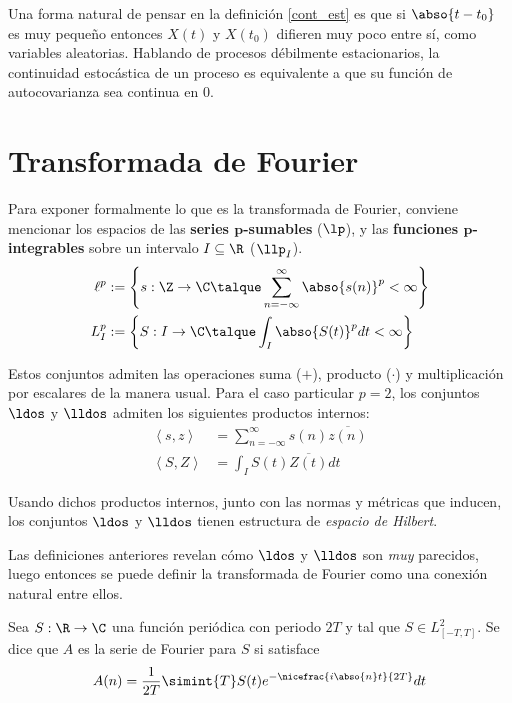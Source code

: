 Una forma natural de pensar en la definición \ref{cont_est} es que si $\abso{t-t_0}$ es muy pequeño 
entonces $X(t)$ y $X(t_0)$ difieren muy poco entre sí, como variables aleatorias.
%
Hablando de procesos débilmente estacionarios, la continuidad estocástica de un proceso es 
equivalente a que su función de autocovarianza sea continua en 0.


\section{Transformada de Fourier}

Para exponer formalmente lo que es la transformada de Fourier, conviene mencionar los espacios de 
las \textbf{series $\boldsymbol{p}$-sumables} ($\lp$), y las  \textbf{funciones 
$\boldsymbol{p}$-integrables} sobre un intervalo $I \subseteq \R$ ($\llp_I$).
\begin{align*}
\ell^{p} &:= \left\{ s: \Z\rightarrow\C \talque \sum_{n=-\infty}^{\infty} \abso{s(n)}^{p} < \infty \right\}
\\
L^{p}_I &:= \left\{ S: I\rightarrow\C \talque \int_I \abso{S(t)}^{p} dt < \infty \right\}
\end{align*}

Estos conjuntos admiten las operaciones  suma ($+$), producto ($\cdot$) y multiplicación por 
escalares de la manera usual.
%
Para el caso particular $p=2$, los conjuntos $\ldos$ y $\lldos$ admiten los siguientes productos 
internos:
%
\begin{align*}
\left\langle s,z \right\rangle &= \sum_{n=-\infty}^{\infty} s(n) \overline{z(n)}\\
\left\langle S,Z \right\rangle &= \int_I S(t) \overline{Z(t)} dt
\end{align*}

Usando dichos productos internos, junto con las normas y métricas que inducen, los conjuntos 
$\ldos$ y $\lldos$ tienen estructura de \textit{espacio de Hilbert}.

Las definiciones anteriores revelan cómo $\ldos$ y $\lldos$ son \textit{muy} parecidos, luego
entonces se puede definir la transformada de Fourier como una conexión natural entre ellos.

\begin{definicion}
Sea $S: \R \rightarrow \C$ una función periódica con periodo $2T$ y tal que 
$S \in L^{2}_{[-T,T]}$. Se dice que $A$ es la serie de Fourier para $S$ si satisface
\begin{equation*}
A(n) = \frac{1}{2 T} \simint{T} S(t) e^{-\nicefrac{ i \abso{n} t}{2T}} dt
\end{equation*}
\label{FourierClasico}
\end{definicion}

